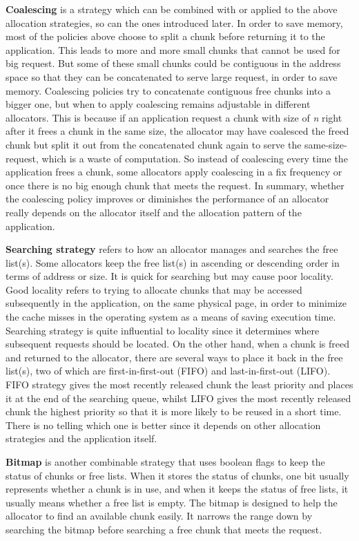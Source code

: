 \documentclass{acm_proc_article-sp}
\begin{document}
\textbf{Coalescing} is a strategy which can be combined with or applied to the above allocation strategies, so can the ones introduced later. In order to save memory, most of the policies above choose to split a chunk before returning it to the application. This leads to more and more small chunks that cannot be used for big request. But some of these small chunks could be contiguous in the address space so that they can be concatenated to serve large request, in order to save memory. Coalescing policies try to concatenate contiguous free chunks into a bigger one, but when to apply coalescing remains adjustable in different allocators. This is because if an application request a chunk with size of \emph{n} right after it frees a chunk in the same size, the allocator may have coalesced the freed chunk but split it out from the concatenated chunk again to serve the same-size-request, which is a waste of computation. So instead of coalescing every time the application frees a chunk, some allocators apply coalescing in a fix frequency or once there is no big enough chunk that meets the request. In summary, whether the coalescing policy improves or diminishes the performance of an allocator really depends on the allocator itself and the allocation pattern of the application.

\textbf{Searching strategy} refers to how an allocator manages and searches the free list(s). Some allocators keep the free list(s) in ascending or descending order in terms of address or size. It is quick for searching but may cause poor locality. Good locality refers to trying to allocate chunks that may be accessed subsequently in the application, on the same physical page, in order to minimize the cache misses in the operating system as a means of saving execution time. Searching strategy is quite influential to locality since it determines where subsequent requests should be located. On the other hand, when a chunk is freed and returned to the allocator, there are several ways to place it back in the free list(s), two of which are first-in-first-out (FIFO) and last-in-first-out (LIFO). FIFO strategy gives the most recently released chunk the least priority and places it at the end of the searching queue, whilst LIFO gives the most recently released chunk the highest priority so that it is more likely to be reused in a short time. There is no telling which one is better since it depends on other allocation strategies and the application itself.

\textbf{Bitmap} is another combinable strategy that uses boolean flags to keep the status of chunks or free lists. When it stores the status of chunks, one bit usually represents whether a chunk is in use, and when it keeps the status of free lists, it usually means whether a free list is empty. The bitmap is designed to help the allocator to find an available chunk easily. It narrows the range down by searching the bitmap before searching a free chunk that meets the request.
\end{document}
